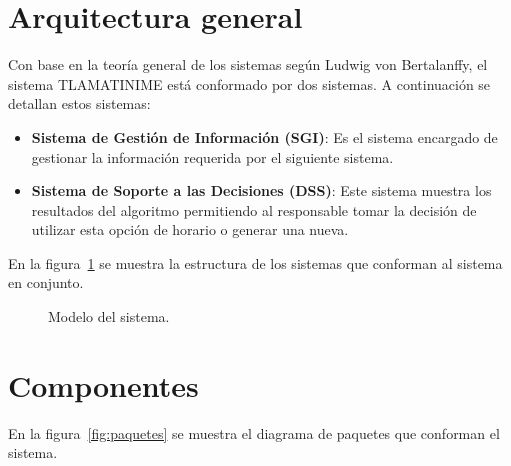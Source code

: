 \label{sec:bosquejoGeneral}

\section{Arquitectura general}

	Con base en la teoría general de los sistemas según Ludwig von Bertalanffy, el sistema TLAMATINIME está conformado por dos sistemas. A continuación se detallan estos sistemas:
	
	\begin{itemize}
		\item \textbf{Sistema de Gestión de Información (SGI)}: Es el sistema encargado de gestionar la información requerida por el siguiente sistema.
				
		\item \textbf{Sistema de Soporte a las Decisiones (DSS)}: Este sistema muestra los resultados del algoritmo permitiendo al responsable tomar la decisión de utilizar esta opción de horario o generar una nueva.
	\end{itemize}
	
	En la figura~\ref{fig:sistemaT} se muestra la estructura de los sistemas que conforman al sistema en conjunto.

	\begin{figure}[htbp!]
		\begin{center}
			\caption{Modelo del sistema.}
			\label{fig:sistemaT}
		\end{center}
	\end{figure}

	

\section{Componentes}

	En la figura~\ref{fig:paquetes} se muestra el diagrama de paquetes que conforman el sistema.
	
